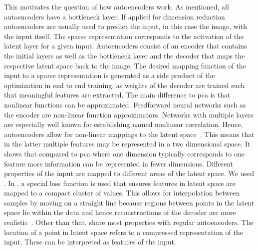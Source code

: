 \bigskip
This motivates the question of how autoencoders work. As mentioned, all autoencoders have a bottleneck layer. If applied for dimension reduction autoencoders are usually used to predict the input, in this case the image, with the input itself. The sparse representation corresponds to the activation of the latent layer for a given input. Autoencoders consist of an encoder that contains the initial layers as well as the bottleneck layer and the decoder that maps the respective latent space back to the image. The desired mapping function of the input to a sparse representation is generated as a side product of the optimization in end to end training, as weights of the decoder are trained such that meaningful features are extracted. The main difference to \acrshort{pca} is that nonlinear functions can be approximated. Feedforward neural networks such as the encoder are non-linear function approximators. Networks with multiple layers are especially well known for establishing named nonlinear correlation. Hence, autoencoders allow for non-linear mappings to the latent space~\citep{kramer1991nonlinear}. This means that in the latter multiple features may be represented in a two dimensional space. It shows that compared to \acrshort{pca} where one dimension typically corresponds to one feature more information can be represented in fewer dimensions. Different properties of the input are mapped to different areas of the latent space. We used . In , a special loss function is used that ensures features in latent space are mapped to a compact cluster of values. This allows for interpolation between samples by moving on a straight line because regions between points in the latent space lie within the data and hence reconstructions of the decoder are more realistic~\citep{keras2020vae}. Other than that,  share most properties with regular autoencoders. The location of a point in latent space refers to a compressed representation of the input. These can be interpreted as features of the input.


